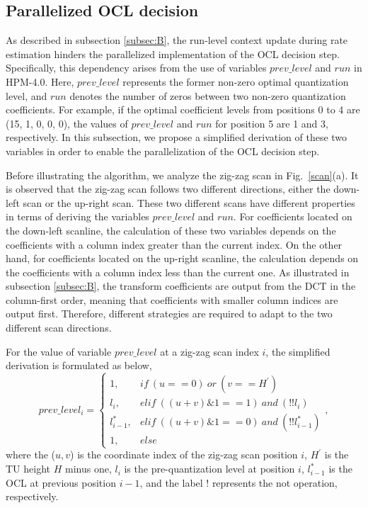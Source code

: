 \documentclass[lettersize,journal]{IEEEtran}
\begin{document}
\subsection{Parallelized OCL decision} 
\label{subsecOCL:B}
As described in subsection \ref{subsec:B}, the run-level context update during rate estimation hinders the parallelized implementation of the OCL decision step. Specifically, this dependency arises from the use of variables $prev\_level$ and $run$ in HPM-4.0. Here, $prev\_level$ represents the former non-zero optimal quantization level, and $run$ denotes the number of zeros between two non-zero quantization coefficients. For example, if the optimal coefficient levels from positions 0 to 4 are (15, 1, 0, 0, 0), the values of $prev\_level$ and $run$ for position 5 are 1 and 3, respectively. In this subsection, we propose a simplified derivation of these two variables in order to enable the parallelization of the OCL decision step. 

Before illustrating the algorithm, we analyze the zig-zag scan in Fig.~\ref{scan}(a). It is observed that the zig-zag scan follows two different directions, either the down-left scan or the up-right scan. These two different scans have different properties in terms of deriving the variables $prev\_level$ and $run$. For coefficients located on the down-left scanline, the calculation of these two variables depends on the coefficients with a column index greater than the current index. On the other hand, for coefficients located on the up-right scanline, the calculation depends on the coefficients with a column index less than the current one. As illustrated in subsection \ref{subsec:B}, the transform coefficients are output from the DCT in the column-first order, meaning that coefficients with smaller column indices are output first. Therefore, different strategies are required to adapt to the two different scan directions. 

For the value of variable $prev\_level$ at a zig-zag scan index $i$, the simplified derivation is formulated as below, 
\begin{equation}
	prev\_level_{i} =\begin{cases}
		\label{prevlevel}
		1,           & if \ (u==0)\ or\ (v==H^{'}) \\
		l_{i},       & elif \ ((u+v)\&1==1)\ and\ (!!l_{i}) \\
		l_{i-1}^{*}, & elif \ ((u+v)\&1==0)\ and\ (!!l_{i-1}^{*}) \\
            1,        & else 
	\end{cases},
\end{equation}
where the ($u, v$) is the coordinate index of the zig-zag scan position $i$, $H^{'}$ is the TU height $H$ minus one, $l_{i}$ is the pre-quantization level at position $i$, $l_{i-1}^{*}$ is the OCL at previous position $i-1$, and the label ! represents the not operation, respectively. 
\end{document}
